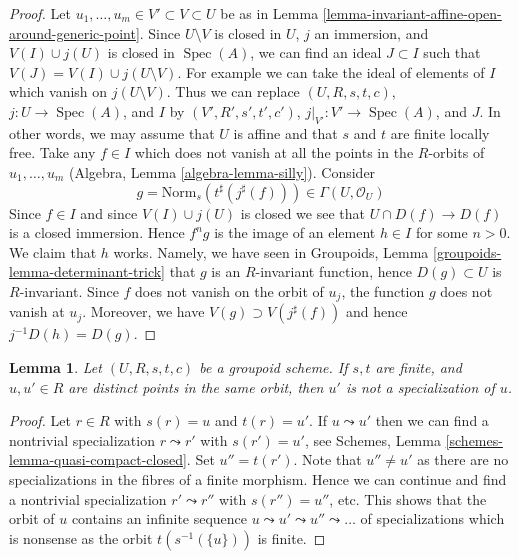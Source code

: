 \documentclass[10pt,a4paper]{amsart}
\theoremstyle{plain}
\newtheorem{lemma}[subsection]{Lemma}
\theoremstyle{definition}
\theoremstyle{remark}
\numberwithin{equation}{subsection}
\def\Spec{\mathop{\mathrm{Spec}}}
\begin{document}
\begin{proof}
Let $u_1, \ldots, u_m \in V' \subset V \subset U$ be as in
Lemma \ref{lemma-invariant-affine-open-around-generic-point}.
Since $U \setminus V$ is closed in $U$, $j$ an immersion, and $V(I) \cup j(U)$
is closed in $\Spec(A)$, we can find an ideal
$J \subset I$ such that $V(J) = V(I) \cup j(U \setminus V)$.
For example we can take the ideal of elements of $I$ which
vanish on $j(U \setminus V)$. Thus we can replace
$(U, R, s, t, c)$, $j : U \to \Spec(A)$, and $I$ by
$(V', R', s', t', c')$, $j|_{V'} : V' \to \Spec(A)$, and $J$.
In other words, we may assume that $U$ is affine and that
$s$ and $t$ are finite locally free.
Take any $f \in I$ which does not vanish at all the
points in the $R$-orbits of $u_1, \ldots, u_m$
(Algebra, Lemma \ref{algebra-lemma-silly}). Consider
$$
g = \text{Norm}_s(t^\sharp(j^\sharp(f))) \in \Gamma(U, \mathcal{O}_U)
$$
Since $f \in I$ and since $V(I) \cup j(U)$ is closed we see that
$U \cap D(f) \to D(f)$ is a closed immersion. Hence $f^ng$ is the
image of an element $h \in I$ for some $n > 0$. We claim that $h$ works.
Namely, we have seen in
Groupoids, Lemma \ref{groupoids-lemma-determinant-trick}
that $g$ is an $R$-invariant function, hence $D(g) \subset U$
is $R$-invariant. Since $f$ does not vanish on the orbit of $u_j$,
the function $g$ does not vanish at $u_j$. Moreover, we have
$V(g) \supset V(j^\sharp(f))$ and hence $j^{-1}D(h) = D(g)$.
\end{proof}

\begin{lemma}
\label{lemma-no-specializations-map-to-same-point}
Let $(U, R, s, t, c)$ be a groupoid scheme. If $s, t$ are finite,
and $u, u' \in R$ are distinct points in the same orbit,
then $u'$ is not a specialization of $u$.
\end{lemma}

\begin{proof}
Let $r \in R$ with $s(r) = u$ and $t(r) = u'$. If $u \leadsto u'$
then we can find a nontrivial specialization $r \leadsto r'$ with
$s(r') = u'$, see 
Schemes, Lemma \ref{schemes-lemma-quasi-compact-closed}.
Set $u'' = t(r')$. Note that $u'' \not = u'$ as there are no
specializations in the fibres of a finite morphism.
Hence we can continue and find a nontrivial specialization
$r' \leadsto r''$ with $s(r'') = u''$, etc. This shows that the
orbit of $u$ contains an infinite sequence
$u \leadsto u' \leadsto u'' \leadsto \ldots$
of specializations which is nonsense as the orbit
$t(s^{-1}(\{u\}))$ is finite.
\end{proof}
\end{document}

